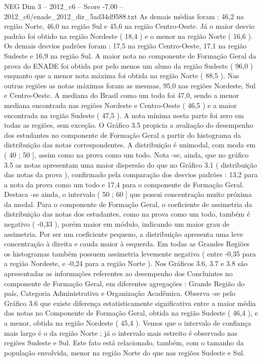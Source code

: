 \begin{textsample}{NEG Dim 3 – 2012\_c6 – Score -7.00 – 2012\_c6/enade\_2012\_dir\_5ad34d9588.txt}
As demais médias foram : 46,2 na região Norte, 46,0 na região Sul e 45,6 na região Centro-Oeste.
Já o maior desvio padrão foi obtido na região Nordeste ( 18,4 ) e o menor na região Norte ( 16,6 ).
Os demais desvios padrões foram : 17,5 na região Centro-Oeste, 17,1 na região Sudeste e 16,9 na região Sul.
A maior nota no componente de Formação Geral da prova do ENADE foi obtida por pelo menos um aluno da região Sudeste ( 96,0 ) enquanto que a menor nota máxima foi obtida na região Norte ( 88,5 ).
Nas outras regiões as notas máximas foram as mesmas, 95,0 nas regiões Nordeste, Sul e Centro-Oeste.
A mediana do Brasil como um todo foi 47,0, sendo a menor mediana encontrada nas regiões Nordeste e Centro-Oeste ( 46,5 ) e a maior encontrada na região Sudeste ( 47,5 ).
A nota mínima nesta parte foi zero em todas as regiões, sem exceção.
O Gráfico 3.5 propicia a avaliação do desempenho dos estudantes no componente de Formação Geral a partir do histograma da distribuição das notas correspondentes.
A distribuição é unimodal, com moda em ( 40 ; 50 ], assim como na prova como um todo.
Nota -se, ainda, que no gráfico 3.5 as notas apresentam uma maior dispersão do que no Gráfico 3.1 ( distribuição das notas da prova ), confirmado pela comparação dos desvios padrões : 13,2 para a nota da prova como um todo e 17,4 para o componente de Formação Geral.
Destaca -se ainda, o intervalo ( 50 ; 60 ] que possui concentração muito próxima da modal.
Para o componente de Formação Geral, o coeficiente de assimetria da distribuição das notas dos estudantes, como na prova como um todo, também é negativo ( -0,33 ), porém maior em módulo, indicando um maior grau de assimetria.
Por ser um coeficiente pequeno, a distribuição apresenta uma leve concentração à direita e cauda maior à esquerda.
Em todas as Grandes Regiões os histogramas também possuem assimetria levemente negativa ( entre -0,35 para a região Nordeste, e -0,24 para a região Norte ).
Nos Gráficos 3.6, 3.7 e 3.8 são apresentadas as informações referentes ao desempenho dos Concluintes no componente de Formação Geral, em diferentes agregações : Grande Região do país, Categoria Administrativa e Organização Acadêmica.
Observa -se pelo Gráfico 3.6 que existe diferença estatisticamente significativa entre a maior média das notas no Componente de Formação Geral, obtida na região Sudeste ( 46,4 ), e a menor, obtida na região Nordeste ( 45,4 ).
Vemos que o intervalo de confiança mais largo é o da região Norte ; já o intervalo mais estreito é observado nas regiões Sudeste e Sul.
Este fato está relacionado, também, com o tamanho da população envolvida, menor na região Norte do que nas regiões Sudeste e Sul.

\end{textsample}
